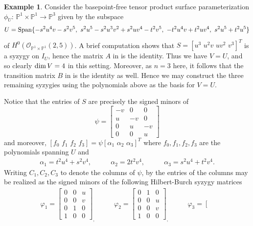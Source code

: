 \documentclass[reqno]{amsart}
\numberwithin{equation}{section}
\theoremstyle{definition}
\newtheorem{ex}[thm]{Example}
\def\O{\mathcal{O}}
\def\P{\mathbb{P}}
\def\dim{\mathop{\rm dim}}
\def\Span{\mathop{\rm Span}}
\begin{document}
\begin{ex}\label{Example - dim V = 4}
Consider the basepoint-free tensor product surface parameterization $\phi_U:\,\P^1\times\P^1\rightarrow \P^3$ given by the subspace
$$U = \Span\{-s^2u^4v-s^2v^5,\,\,
s^2u^5-s^2u^3v^2+s^2uv^4-t^2v^5,\,\,
-t^2u^4v+t^2uv^4,\,\,
s^2u^5+t^2u^{5} \}$$
of $H^0(\O_{\P^1\times\P^1}(2,5))$. A brief computation shows that $S=[u^3\,\,u^2v\,\,uv^2\,\,v^3]^T$ is a syzygy on $I_U$, hence the matrix $A$ in  is the identity. Thus we have $V=U$, and so clearly $\dim V=4$ in this setting. Moreover, as $n=3$ here, it follows that the transition matrix $B$ in  is the identity as well. Hence we may construct the three remaining syzygies using the polynomials above as the basis for $V=U$.

Notice that the entries of $S$ are precisely the signed minors of 
\[
\psi = \left[\begin{array}{ccc}
-v &0&0 \\
u& -v&0\\
0&u&-v\\
0&0&u
\end{array}
\right]
\]
and moreover, $[f_0\,\,f_1\,\,f_2\,\,f_3] = \psi [\alpha_1\,\,\alpha_2\,\,\alpha_3]^T$ where $f_0,f_1,f_2,f_3$ are the polynomials spanning $U$ and
\[
\begin{array}{ccc}
     \alpha_1= t^2u^4+s^2v^4, \quad\quad &\alpha_2=2t^2v^4, \quad\quad &\alpha_3= s^2u^4+t^2v^4. 
\end{array}
\]
Writing $C_1, C_2, C_3$ to denote the columns of $\psi$, by  the entries of the columns may be realized as the signed minors of the following Hilbert-Burch syzygy matrices
\[
\begin{array}{ccc}
   \varphi_1=\left[
   \begin{array}{ccc}
   0&0&u\\
   0&0&v\\
   0&1&0\\
   1&0&0
   \end{array}
   \right]_,\quad\quad
   &\varphi_2=\left[
   \begin{array}{ccc}
   0&1&0\\
   0&0&u\\
   0&0&v\\
   1&0&0
   \end{array}
   \right]_,\quad\quad
   &\varphi_3=\left[
   \begin{array}{ccc}

\end{array}
\end{array}\]
\end{ex}
\end{document}
